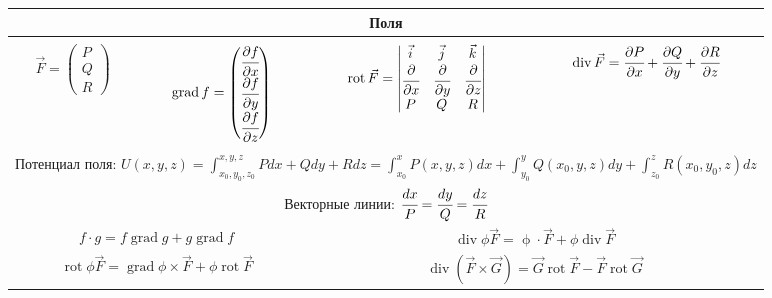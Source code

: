 
\begin{tabular}{c|c|c|c}
	\multicolumn{4}{c}{Поля} \\
	\hline & & &\\
$\displaystyle \vec{F} = \left(\begin{matrix}
P \\ Q \\ R
\end{matrix}\right)$ &

$\displaystyle \operatorname{grad} f = \left(
\begin{matrix}
\cfrac{\partial f}{\partial x} \\ \cfrac{\partial f}{\partial y} \\
\cfrac{\partial f}{\partial z}
\end{matrix}
\right)$

&

$\displaystyle \operatorname{rot} \vec{F} =
\begin{vmatrix}
\vec{i} & \vec{j} & \vec{k} \\
\cfrac{\partial}{\partial x} & \cfrac{\partial}{\partial y} &
\cfrac{\partial}{\partial z} \\
P & Q & R
\end{vmatrix}
$
&
$\displaystyle \operatorname{div}\vec{F} = \cfrac{\partial P}{\partial x} + \cfrac{\partial Q}{\partial y} +
\cfrac{\partial R}{\partial z}$ \\[1.5cm]
\hline
\multicolumn{4}{c}{} \\
\multicolumn{4}{c}{Потенциал поля: $\displaystyle
	U(x,y,z) = \int_{x_0, y_0, z_0}^{x,y,z} Pdx+Qdy+Rdz =
	\int_{x_0}^{x} P(x,y,z)dx + \int_{y_0}^{y}Q(x_0,y,z)dy +
	\int_{z_0}^{z} R(x_0,y_0,z)dz
	$}\\[0.5cm]

\multicolumn{4}{c}{Векторные линии: $
	\cfrac{dx}{P} = \cfrac{dy}{Q} = \cfrac{dz}{R}
	$}
\\[0.5cm]

\multicolumn{2}{c}{
$\displaystyle f\cdot g = f\operatorname{grad}g + g\operatorname{grad}f$} &
\multicolumn{2}{c}{$\displaystyle \operatorname{div}\phi \vec{F} = \operatorname{\phi}\cdot \vec{F} + \phi \operatorname{div}\vec{F}$} \\[0.5cm]

\multicolumn{2}{c}{$\displaystyle \operatorname{rot}\phi \vec{F} =
\operatorname{grad}\phi \times \vec{F} + \phi \operatorname{rot} \vec{F}$}
 &
\multicolumn{2}{c}{
$\displaystyle \operatorname{div}(\vec{F}\times\vec{G}) = \vec{G} \operatorname{rot}\vec{F} - \vec{F}\operatorname{rot}\vec{G}$}\\[0.5cm]
\hline
\end{tabular} 